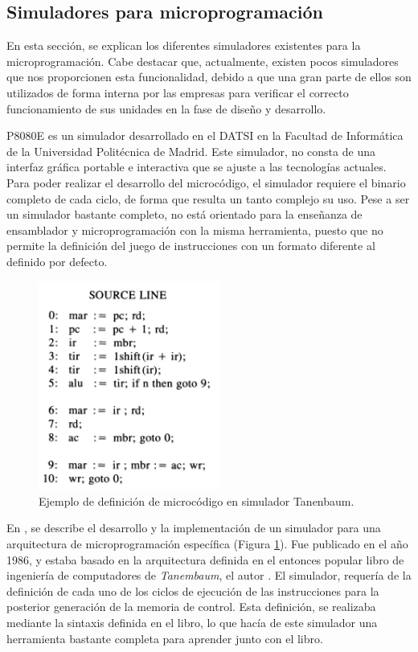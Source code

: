 \subsection{Simuladores para microprogramación}
\label{sec:simuladores_microprogramacion}

En esta sección, se explican los diferentes simuladores existentes para la microprogramación. Cabe destacar que, actualmente, existen pocos simuladores que nos proporcionen esta funcionalidad, debido a que una gran parte de ellos son utilizados de forma interna por las empresas para verificar el correcto funcionamiento de sus unidades en la fase de diseño y desarrollo. 

P8080E \cite{p8080E} es un simulador desarrollado en el DATSI en la Facultad de Informática de la Universidad Politécnica de Madrid. Este simulador, no consta de una interfaz gráfica portable e interactiva que se ajuste a las tecnologías actuales. Para poder realizar el desarrollo del microcódigo, el simulador requiere el binario completo de cada ciclo, de forma que resulta un tanto complejo su uso. Pese a ser un simulador bastante completo, no está orientado para la enseñanza de ensamblador y microprogramación con la misma herramienta, puesto que no permite la definición del juego de instrucciones con un formato diferente al definido por defecto.

\begin{figure}[htbp]
 	\centering
 	\includegraphics[width=6cm]{figures/ejemploTanenbaum}
 	\caption{Ejemplo de definición de microcódigo en simulador Tanenbaum.}
	\label{fig:tanenbaum_figure}
\end{figure}

En \cite{yen1986development}, se describe el desarrollo y la implementación de un simulador para una arquitectura de microprogramación específica (Figura \ref{fig:tanenbaum_figure}). Fue publicado en el año 1986, y estaba basado en la arquitectura definida en el entonces popular libro de ingeniería de computadores de \textit{Tanembaum}, el autor \cite{tanenbaum1984}. El simulador, requería de la definición de cada uno de los ciclos de ejecución de las instrucciones para la posterior generación de la memoria de control. Esta definición, se realizaba mediante la sintaxis definida en el libro, lo que hacía de este simulador una herramienta bastante completa para aprender junto con el libro. 


